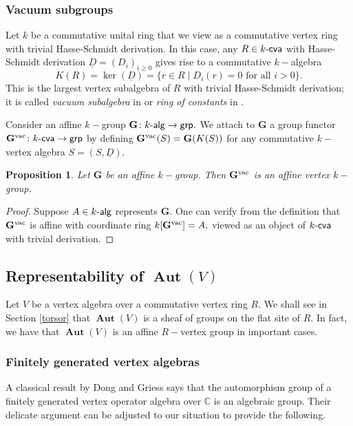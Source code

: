 \documentclass{article}
\newtheorem{prop}[thm]{Proposition}
\theoremstyle{definition}
\def\BAut{\ensuremath{\operatorname{\mathbf{Aut}}}}
\def\kcva{\ensuremath{k\text{-\textup{\textsf{cva}}}}}
\def\kalg{\ensuremath{k\text{-\textup{\textsf{alg}}}}}
\def\grp{\ensuremath{\text{\textup{\textsf{grp}}}}}
\def\BG{\ensuremath{\mathbf{G}}}
\def\GVac{\ensuremath{{\mathbf{G}^{\textup{vac}}}}}
\begin{document}
{\subsubsection{Vacuum subgroups} \label{vacuumsubgroups}

Let $k$ be a commutative unital ring that we view as a commutative vertex ring with trivial Hasse-Schmidt derivation.
In this case, any $R \in \kcva$ with Hasse-Schmidt derivation $\underline D = (D_i)_{i \geq 0}$ gives rise to a commutative $k-$algebra 
\[ K(R) = \ker(\underline D) = \{ r \in R \mid D_i(r) = 0 \text{ for all $i > 0$} \}. \]
This is the largest vertex subalgebra of $R$ with trivial Hasse-Schmidt derivation; it is called \textit{vacuum subalgebra} in \cite{Kac}  or \textit{ring of constants} in \cite{B}.

Consider an affine  $k-$group $\mathbf G\colon \kalg \to \grp.$ We attach to $\BG$ a group functor
$\GVac \colon \kcva \rightarrow \grp$ by defining $\GVac (S) = \BG(K(S))$ for any commutative $k-$vertex algebra $S = (S, \underline{D}).$}
\begin{prop} Let $\BG$ be an affine $k-$group. Then $\GVac$ is an affine vertex $k-$group.
\end{prop}
\begin{proof}
Suppose $A \in \kalg$ represents $\BG$.
	One can verify from the definition that  $\GVac$ is affine with coordinate ring $k[\GVac] = A,$  viewed as an object of $\kcva$ with trivial derivation. 
\end{proof}


\subsection{Representability of $\BAut(V)$}

 Let $V$ be a vertex algebra over a commutative vertex ring $R.$ We shall see in Section \ref{torsor} that $\BAut(V)$ is a sheaf of groups on the flat site of $R.$ In fact, we have that $\BAut(V)$ is an affine $R-$vertex group in important cases.

\subsubsection{Finitely generated vertex algebras} A classical result by Dong and Griess \cite{DongGr} says that the automorphism group of a finitely generated vertex operator algebra over $\mathbb C$ is an algebraic group. Their delicate argument can be adjusted to our situation to provide the following.
\end{document}

